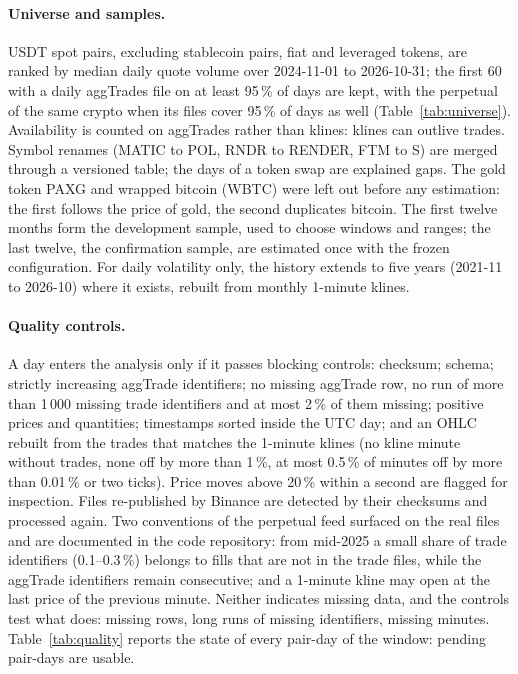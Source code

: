 \documentclass[11pt]{article}
\newcommand{\tableif}[1]{\IfFileExists{tables/#1}{}{}}
\providecommand{\nPairs}{60}
\providecommand{\pairDays}{pending}
\begin{document}
\paragraph{Universe and samples.} USDT spot pairs, excluding stablecoin pairs, fiat and
leveraged tokens, are ranked by median daily quote volume over 2024-11-01 to 2026-10-31;
the first \nPairs{} with a daily aggTrades file on at least 95\,\% of days are kept, with the
perpetual of the same crypto when its files cover 95\,\% of days as well
(Table~\ref{tab:universe}). Availability is counted on aggTrades rather than klines:
klines can outlive trades. Symbol renames (MATIC to POL, RNDR to RENDER, FTM to S) are
merged through a versioned table; the days of a token swap are explained gaps. The gold
token PAXG and wrapped bitcoin (WBTC) were left out before any estimation: the first
follows the price of gold, the second duplicates bitcoin. The first twelve months form the
development sample, used to choose windows and ranges; the last twelve, the confirmation
sample, are estimated once with the frozen configuration. For daily volatility only, the
history extends to five years (2021-11 to 2026-10) where it exists, rebuilt from monthly
1-minute klines.
\tableif{universe.tex}

\paragraph{Quality controls.} A day enters the analysis only if it passes blocking controls:
checksum; schema; strictly increasing aggTrade identifiers; no missing aggTrade row, no run
of more than 1\,000 missing trade identifiers and at most 2\,\% of them missing; positive
prices and quantities; timestamps sorted inside the UTC day; and an OHLC rebuilt from the
trades that matches the 1-minute klines (no kline minute without trades, none off by more
than 1\,\%, at most 0.5\,\% of minutes off by more than 0.01\,\% or two ticks). Price moves
above 20\,\% within a second are flagged for inspection. Files re-published by Binance are
detected by their checksums and processed again. Two conventions of the perpetual feed
surfaced on the real files and are documented in the code repository: from mid-2025 a
small share of trade identifiers (0.1--0.3\,\%) belongs to fills that are not in the trade
files, while the aggTrade identifiers remain consecutive; and a 1-minute kline may open at the
last price of the previous minute. Neither indicates missing data, and the controls test
what does: missing rows, long runs of missing identifiers, missing minutes.
Table~\ref{tab:quality} reports the state of every pair-day of the window: \pairDays{}
pair-days are usable.
\tableif{quality.tex}
\end{document}
